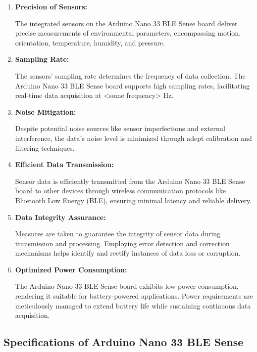 \begin{enumerate}
	\item \textbf{Precision of Sensors:}
	
	The integrated sensors on the Arduino Nano 33 BLE Sense board deliver precise measurements of environmental parameters, encompassing motion, orientation, temperature, humidity, and pressure.
	
	\item \textbf{Sampling Rate:}
	
	The sensors' sampling rate determines the frequency of data collection. The Arduino Nano 33 BLE Sense board supports high sampling rates, facilitating real-time data acquisition at \textless{}some frequency\textgreater{} Hz.
	
	\item \textbf{ Noise Mitigation:}
	
	Despite potential noise sources like sensor imperfections and external interference, the data's noise level is minimized through adept calibration and filtering techniques.
	
	\item \textbf{Efficient Data Transmission:}
	
	Sensor data is efficiently transmitted from the Arduino Nano 33 BLE Sense board to other devices through wireless communication protocols like Bluetooth Low Energy (BLE), ensuring minimal latency and reliable delivery.
	
	\item \textbf{Data Integrity Assurance:}
	
	Measures are taken to guarantee the integrity of sensor data during transmission and processing. Employing error detection and correction mechanisms helps identify and rectify instances of data loss or corruption.\cite{TensorFlow:2023}
	
	\item \textbf{Optimized Power Consumption:}
	
	The Arduino Nano 33 BLE Sense board exhibits low power consumption, rendering it suitable for battery-powered applications. Power requirements are meticulously managed to extend battery life while sustaining continuous data acquisition.
\end{enumerate}

\subsection{Specifications of Arduino Nano 33 BLE Sense}



